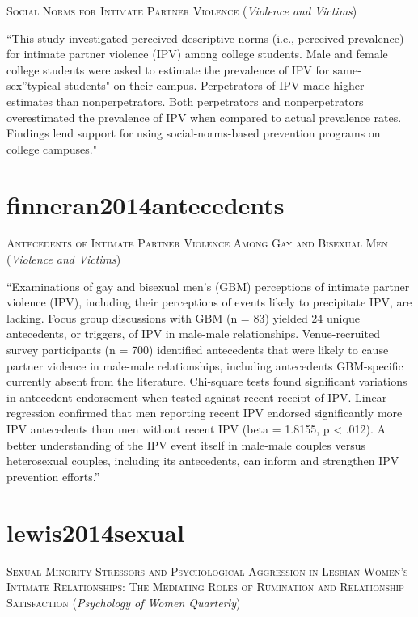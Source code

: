 \documentclass[]{tufte-handout}
\begin{document}
\textsc{\large{Social Norms for Intimate Partner Violence}}
(\emph{Violence and Victims})

``This study investigated perceived descriptive norms (i.e., perceived
prevalence) for intimate partner violence (IPV) among college students.
Male and female college students were asked to estimate the prevalence
of IPV for same-sex''typical students" on their campus. Perpetrators of
IPV made higher estimates than nonperpetrators. Both perpetrators and
nonperpetrators overestimated the prevalence of IPV when compared to
actual prevalence rates. Findings lend support for using
social-norms-based prevention programs on college campuses."

\section{\texorpdfstring{\textcolor[HTML]{5b0057}{finneran2014antecedents}}{}}\label{section-52}

\textsc{\large{Antecedents of Intimate Partner Violence Among Gay and Bisexual Men}}
(\emph{Violence and Victims})

``Examinations of gay and bisexual men's (GBM) perceptions of intimate
partner violence (IPV), including their perceptions of events likely to
precipitate IPV, are lacking. Focus group discussions with GBM (n = 83)
yielded 24 unique antecedents, or triggers, of IPV in male-male
relationships. Venue-recruited survey participants (n = 700) identified
antecedents that were likely to cause partner violence in male-male
relationships, including antecedents GBM-specific currently absent from
the literature. Chi-square tests found significant variations in
antecedent endorsement when tested against recent receipt of IPV. Linear
regression confirmed that men reporting recent IPV endorsed
significantly more IPV antecedents than men without recent IPV (beta =
1.8155, p \textless{} .012). A better understanding of the IPV event
itself in male-male couples versus heterosexual couples, including its
antecedents, can inform and strengthen IPV prevention efforts.''

\section{\texorpdfstring{\textcolor[HTML]{5b0057}{lewis2014sexual}}{}}\label{section-53}

\textsc{\large{Sexual Minority Stressors and Psychological Aggression in Lesbian Women's Intimate Relationships: The Mediating Roles of Rumination and Relationship Satisfaction}}
(\emph{Psychology of Women Quarterly})
\end{document}
